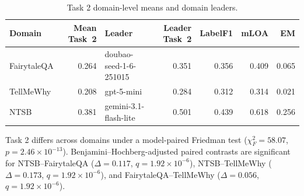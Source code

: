 \documentclass[pdflatex,sn-mathphys-num]{sn-jnl}%
\theoremstyle{thmstyleone}%
\theoremstyle{thmstyletwo}%
\theoremstyle{thmstylethree}%
\begin{document}
\begin{table}
\centering
\caption{Task 2 domain-level means and domain leaders.}
\label{tab:task2_domains}
\small
\setlength{\tabcolsep}{5.0pt}
\begin{tabular}{lrlrrrr}
\toprule
Domain & Mean Task~2 & Leader & Leader Task~2 & LabelF1 & mLOA & EM \\
\midrule
FairytaleQA & 0.264 & doubao-seed-1-6-251015 & 0.351 & 0.356 & 0.409 & 0.065 \\
TellMeWhy & 0.208 & gpt-5-mini & 0.284 & 0.312 & 0.314 & 0.021 \\
NTSB & 0.381 & gemini-3.1-flash-lite & 0.501 & 0.439 & 0.618 & 0.256 \\
\bottomrule
\end{tabular}
\footnotesize
Task 2 differs across domains under a model-paired Friedman test ($\chi_F^2=58.07$, $p=2.46\times10^{-13}$). Benjamini--Hochberg-adjusted paired contrasts are significant for NTSB--FairytaleQA ($\Delta=0.117$, $q=1.92\times10^{-6}$), NTSB--TellMeWhy ($\Delta=0.173$, $q=1.92\times10^{-6}$), and FairytaleQA--TellMeWhy ($\Delta=0.056$, $q=1.92\times10^{-6}$).
\end{table}
\end{document}
